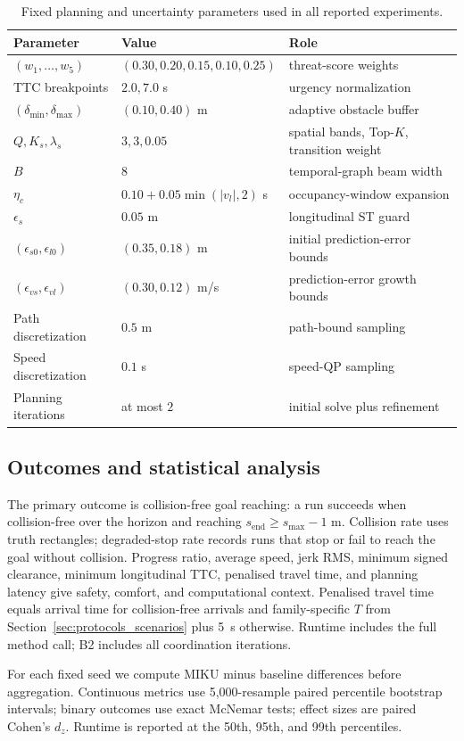 \begin{table}[t]
\centering
\caption{Fixed planning and uncertainty parameters used in all reported experiments.}
\label{tab:fixed_parameters}
\small
\begin{tabular}{lll}
\toprule
Parameter & Value & Role \\
\midrule
$(w_1,\ldots,w_5)$ & $(0.30,0.20,0.15,0.10,0.25)$ & threat-score weights \\
TTC breakpoints & $2.0,7.0$ s & urgency normalization \\
$(\delta_{\min},\delta_{\max})$ & $(0.10,0.40)$ m & adaptive obstacle buffer \\
$Q,K_s,\lambda_s$ & $3,3,0.05$ & spatial bands, Top-$K$, transition weight \\
$B$ & $8$ & temporal-graph beam width \\
$\eta_c$ & $0.10+0.05\min(|v_l|,2)$ s & occupancy-window expansion \\
$\epsilon_s$ & $0.05$ m & longitudinal ST guard \\
$(\epsilon_{s0},\epsilon_{l0})$ & $(0.35,0.18)$ m & initial prediction-error bounds \\
$(\epsilon_{vs},\epsilon_{vl})$ & $(0.30,0.12)$ m/s & prediction-error growth bounds \\
Path discretization & $0.5$ m & path-bound sampling \\
Speed discretization & $0.1$ s & speed-QP sampling \\
Planning iterations & at most $2$ & initial solve plus refinement \\
\bottomrule
\end{tabular}
\end{table}

\subsection{Outcomes and statistical analysis}
\label{sec:outcomes_stats}

The primary outcome is collision-free goal reaching: a run succeeds when collision-free over the horizon and reaching $s_{\mathrm{end}}\geq s_{\max}-1$ m. Collision rate uses truth rectangles; degraded-stop rate records runs that stop or fail to reach the goal without collision. Progress ratio, average speed, jerk RMS, minimum signed clearance, minimum longitudinal TTC, penalised travel time, and planning latency give safety, comfort, and computational context. Penalised travel time equals arrival time for collision-free arrivals and family-specific $T$ from Section~\ref{sec:protocols_scenarios} plus 5~s otherwise. Runtime includes the full method call; B2 includes all coordination iterations.

For each fixed seed we compute MIKU minus baseline differences before aggregation. Continuous metrics use 5,000-resample paired percentile bootstrap intervals; binary outcomes use exact McNemar tests; effect sizes are paired Cohen's $d_z$. Runtime is reported at the 50th, 95th, and 99th percentiles.
